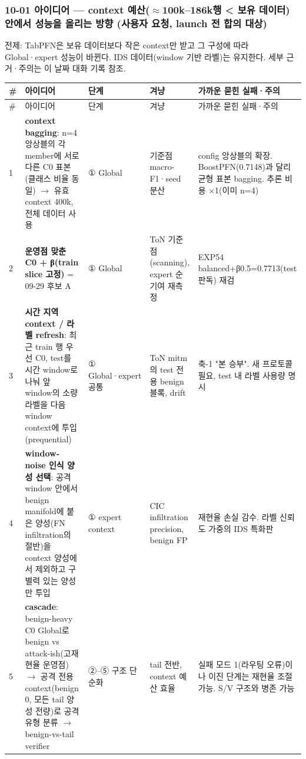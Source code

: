 \subsubsection{10-01 아이디어 — context 예산(\ensuremath{\approx}100k–186k행 < 보유 데이터) 안에서 성능을 올리는 방향 (사용자 요청, launch 전 합의 대상)}
전제: TabPFN은 보유 데이터보다 작은 context만 받고 그 구성에 따라 Global·expert 성능이 바뀐다. IDS 데이터(window 기반 라벨)는 유지한다. 세부 근거·주의는 이 날짜 대화 기록 참조.

\begingroup
\footnotesize
\begin{longtable}{>{\raggedleft\arraybackslash}p{}>{\raggedright\arraybackslash}p{}>{\raggedright\arraybackslash}p{}>{\raggedright\arraybackslash}p{}>{\raggedright\arraybackslash}p{}}
\toprule
\# & 아이디어 & 단계 & 겨냥 & 가까운 묻힌 실패·주의 \\ \midrule
\endfirsthead
\# & 아이디어 & 단계 & 겨냥 & 가까운 묻힌 실패·주의 \\ \midrule
\endhead
{}1 & \textbf{context bagging}: n=\allowbreak{}4 앙상블의 각 member에 서로 다른 C0 표본(클래스 비율 동일)  \ensuremath{\rightarrow}  유효 context 400k, 전체 데이터 사용 & ① Global & 기준점 macro-F1·seed 분산 & 0904 config 앙상블의 확장. BoostPFN(0.7148)과 달리 균형 표본 bagging. 추론 비용 ×1(이미 n=\allowbreak{}4) \\
{}2 & \textbf{운영점 맞춘 C0 +\allowbreak{} β(train slice 고정)} =\allowbreak{} 09-29 후보 A & ① Global & ToN 기준점(scanning), expert 순기여 재측정 & EXP54 balanced+\allowbreak{}β0.5=\allowbreak{}0.7713(test 판독) 재검 \\
{}3 & \textbf{시간 지역 context /\allowbreak{} 라벨 refresh}: 최근 train 행 우선 C0, test를 시간 window로 나눠 앞 window의 소량 라벨을 다음 window context에 투입(prequential) & ① Global·expert 공통 & ToN mitm의 test 전용 benign 블록, drift & 0826 축-1 "본 승부". 새 프로토콜 필요, test 내 라벨 사용량 명시 \\
{}4 & \textbf{window-noise 인식 양성 선택}: 공격 window 안에서 benign manifold에 붙은 양성(FN infiltration의 절반)을 context 양성에서 제외하고 구별력 있는 양성만 투입 & ① expert context & CIC infiltration precision, benign FP & 재현율 손실 감수. 라벨 신뢰도 가중의 IDS 특화판 \\
{}5 & \textbf{cascade}: benign-heavy C0 Global로 benign vs attack-ish(고재현율 운영점)  \ensuremath{\rightarrow}  공격 전용 context(benign 0, 모든 tail 양성 전량)로 공격 유형 분류  \ensuremath{\rightarrow}  benign-vs-tail verifier & ②–⑤ 구조 단순화 & tail 전반, context 예산 효율 & 실패 모드 1(라우팅 오류)이나 이진 단계는 재현율 조절 가능. S/\allowbreak{}V 구조와 병존 가능 \\

\end{longtable}
